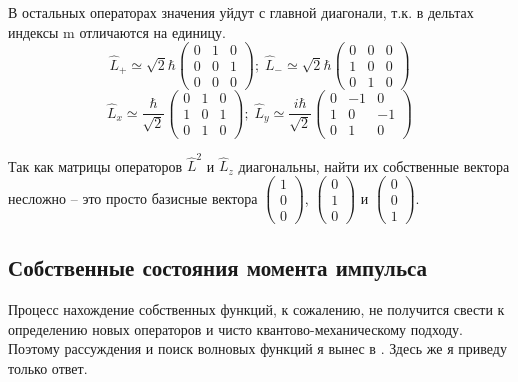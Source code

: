 В остальных операторах значения уйдут с главной диагонали, т.к. в дельтах индексы m отличаются на единицу.
\[
\hat{L}_+ \simeq  \sqrt{2}\hbar \left(\begin{array}{ccc} 0 & 1 & 0 \\ 0 & 0 & 1 \\ 0 & 0 & 0 \end{array} \right); \; \hat{L}_- \simeq  \sqrt{2}\hbar \left(\begin{array}{ccc} 0 & 0 & 0 \\ 1 & 0 & 0 \\ 0 & 1 & 0 \end{array} \right)
\]
\[
\hat{L}_x \simeq  \frac{\hbar}{\sqrt{2}} \left(\begin{array}{ccc} 0 & 1 & 0 \\ 1 & 0 & 1 \\ 0 & 1 & 0 \end{array} \right);\; \hat{L}_y \simeq  \frac{i\hbar}{\sqrt{2}} \left(\begin{array}{ccc} 0 & -1 & 0 \\ 1 & 0 & -1 \\ 0 & 1 & 0 \end{array} \right)
\]

Так как матрицы операторов $\hat{L}^2$ и $\hat{L}_z$ диагональны, найти их собственные вектора несложно -- это просто базисные вектора $ \left(\begin{array}{c} 1 \\ 0  \\ 0  \end{array} \right)$, $ \left(\begin{array}{c} 0 \\ 1 \\ 0  \end{array} \right)$ и $ \left(\begin{array}{c} 0 \\ 0  \\ 1  \end{array} \right)$. 

\subsection{Собственные состояния момента импульса}
Процесс нахождение собственных функций, к сожалению, не получится свести к определению новых операторов и чисто квантово-механическому подходу. Поэтому рассуждения и поиск волновых функций я вынес в . Здесь же я приведу только ответ.

